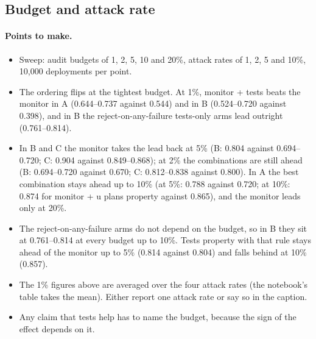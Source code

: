\subsection{Budget and attack rate}
\label{sec:sensitivity}

\paragraph{Points to make.}
\begin{itemize}
  \item Sweep: audit budgets of 1, 2, 5, 10 and 20\%, attack rates of 1, 2, 5
        and 10\%, 10{,}000 deployments per point.
  \item The ordering flips at the tightest budget. At 1\%, monitor + tests beats
        the monitor in A (0.644--0.737 against 0.544) and in B (0.524--0.720
        against 0.398), and in B the reject-on-any-failure tests-only arms lead
        outright (0.761--0.814).
  \item In B and C the monitor takes the lead back at 5\% (B: 0.804 against
        0.694--0.720; C: 0.904 against 0.849--0.868); at 2\% the combinations
        are still ahead (B: 0.694--0.720 against 0.670; C: 0.812--0.838 against
        0.800). In A the best combination stays ahead up to 10\% (at 5\%:
        0.788 against 0.720; at 10\%: 0.874 for monitor + u plans property
        against 0.865), and the monitor leads only at 20\%.
  \item The reject-on-any-failure arms do not depend on the budget, so in B
        they sit at 0.761--0.814 at every budget up to 10\%. Tests property
        with that rule stays ahead of the monitor up to 5\% (0.814 against
        0.804) and falls behind at 10\% (0.857).
  \item The 1\% figures above are averaged over the four attack rates (the
        notebook's table takes the mean). Either report one attack rate or say
        so in the caption.
  \item Any claim that tests help has to name the budget, because the sign of
        the effect depends on it.
\end{itemize}

